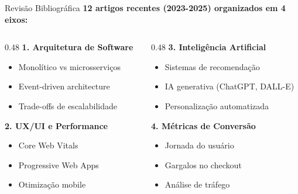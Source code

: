 \documentclass{beamer}
\begin{document}
    \begin{frame}{Revisão Bibliográfica}
        \textbf{12 artigos recentes (2023-2025) organizados em 4 eixos:}

        \vspace{0.4cm}

        \begin{columns}[T]
        \begin{column}{0.48\textwidth}
        \textbf{1. Arquitetura de Software}
        \begin{itemize}
            \item Monolítico vs microsserviços
            \item Event-driven architecture
            \item Trade-offs de escalabilidade
        \end{itemize}

        \vspace{0.3cm}

        \textbf{2. UX/UI e Performance}
        \begin{itemize}
            \item Core Web Vitals
            \item Progressive Web Apps
            \item Otimização mobile
        \end{itemize}
        \end{column}

        \begin{column}{0.48\textwidth}
        \textbf{3. Inteligência Artificial}
        \begin{itemize}
            \item Sistemas de recomendação
            \item IA generativa (ChatGPT, DALL-E)
            \item Personalização automatizada
        \end{itemize}

        \vspace{0.3cm}

        \textbf{4. Métricas de Conversão}
        \begin{itemize}
            \item Jornada do usuário
            \item Gargalos no checkout
            \item Análise de tráfego
        \end{itemize}
        \end{column}
        \end{columns}
    \end{frame}
\end{document}
